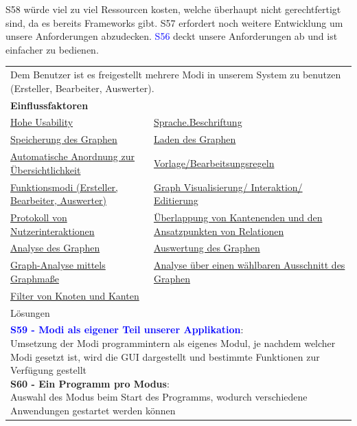 \documentclass[enabledeprecatedfontcommands,fontsize=11pt,paper=a4,twoside]{scrartcl}
\newcounter{one}
\newcommand{\cb}[1]{{\textcolor{blue}{#1}}}
\begin{document}
\begin{onehalfspace}
	S58 würde viel zu viel Ressourcen kosten, welche überhaupt nicht gerechtfertigt sind, da es bereits Frameworks gibt. S57 erfordert noch weitere Entwicklung um unsere Anforderungen abzudecken. \cb{S56} deckt unsere Anforderungen ab und ist einfacher zu bedienen.
\end{onehalfspace}



\newpage
\hspace{-0.65cm}
\begin{tabular} {|p{8cm} p{8cm}|}
	\hline
	\rowcolor{prob}\multicolumn{2}{|l|}{\parbox{16cm}{\textbf{23: Umsetzung der Funktionsmodi}}} \\  \hline\hline 
	\multicolumn{2}{|l|}{\parbox{16cm}{Dem Benutzer ist es freigestellt mehrere Modi in unserem System zu benutzen (Ersteller, Bearbeiter, Auswerter).}}\rule{0pt}{1ex}\\ [1ex] \hline
	\multicolumn{2}{|l|}{\textbf{Einflussfaktoren}}\\
	\hyperlink {g}{Hohe Usability}&
	\hyperlink {hh}{Sprache.Beschriftung} \\
	\hyperlink {v}{Speicherung des Graphen} &
	\hyperlink {w}{Laden des Graphen} \\
	\hyperlink {x}{Automatische Anordnung zur Übersichtlichkeit} &
	\hyperlink {y}{Vorlage/Bearbeitsungsregeln} \\
	\hyperlink {z}{Funktionsmodi (Ersteller, Bearbeiter, Auswerter)} &
	\hyperlink {aa}{Graph Visualisierung/ Interaktion/ Editierung}\\
	\hyperlink {bb}{Protokoll von Nutzerinteraktionen} &
	\hyperlink {cc}{Überlappung von Kantenenden und den Ansatzpunkten von Relationen} \\
	\hyperlink {oo}{Analyse des Graphen} &
	\hyperlink {pp}{Auswertung des Graphen} \\
	\hyperlink {qq}{Graph-Analyse mittels Graphmaße} & 
	\hyperlink {rr}{Analyse über einen wählbaren Ausschnitt des Graphen} \\ 
	\hyperlink {ss}{Filter von Knoten und Kanten} &
	\\ \hline
	\multicolumn{2}{|l|}{Lösungen} \\
	\multicolumn{2}{|l|}{\parbox{16cm}{
			\textbf{\cb{\hypertarget{uuu}{S59 - Modi als eigener Teil unserer Applikation}}}: \\
			Umsetzung der Modi programmintern als eigenes Modul, je nachdem welcher Modi gesetzt ist, wird die GUI dargestellt und bestimmte Funktionen zur Verfügung gestellt \\
			\textbf{S60 - Ein Programm pro Modus}: \\
			Auswahl des Modus beim Start des Programms, wodurch verschiedene Anwendungen gestartet werden können
	} }\\ [6ex] \hline
\end{tabular}\\ \\ \\
\end{document}
